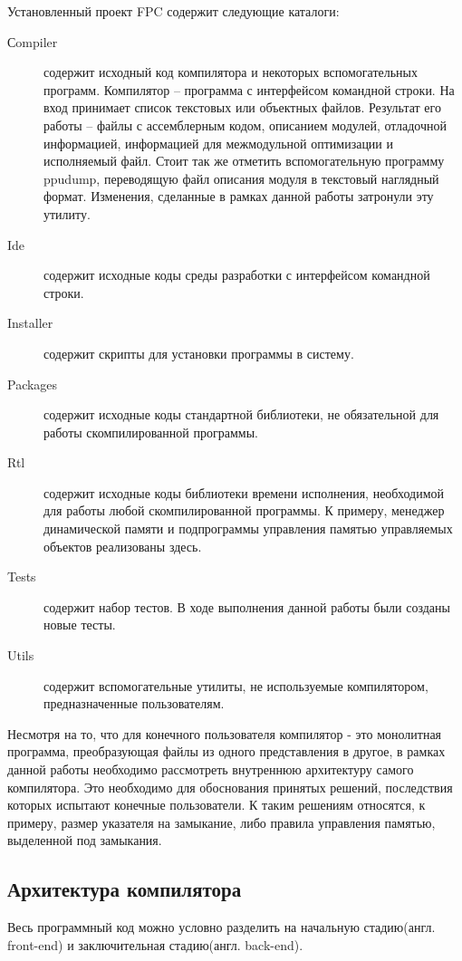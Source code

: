\documentclass{imcs}
\begin{document}
Установленный проект FPC содержит следующие каталоги:
\begin{description}
  \item[Сompiler] содержит исходный код компилятора и некоторых 
  вспомогательных программ. Компилятор -- программа с интерфейсом командной строки. На вход
принимает список текстовых или объектных файлов. Результат его работы --
файлы с ассемблерным кодом, описанием модулей, отладочной информацией,
информацией для межмодульной оптимизации и исполняемый файл. Стоит так же отметить
вспомогательную программу ppudump, переводящую файл описания модуля в текстовый наглядный
формат. Изменения, сделанные в рамках данной работы затронули эту утилиту.
    \item[Ide] содержит исходные коды среды разработки с интерфейсом командной строки.
    \item[Installer] содержит скрипты для установки программы в систему.
    \item[Packages] содержит исходные коды стандартной библиотеки, не обязательной для работы скомпилированной программы.
    \item[Rtl] содержит исходные коды библиотеки времени исполнения, необходимой для работы любой скомпилированной программы. К 
примеру, менеджер динамической памяти и подпрограммы управления памятью
управляемых объектов реализованы здесь.
    \item[Tests] содержит набор тестов. В ходе выполнения данной работы были созданы
новые тесты.
    \item[Utils] содержит вспомогательные утилиты, не используемые компилятором,
предназначенные пользователям.
\end{description}

Несмотря на то, что для конечного пользователя компилятор - это монолитная
программа, преобразующая файлы из одного представления в другое, в рамках
данной работы необходимо рассмотреть внутреннюю архитектуру самого компилятора.
Это необходимо для обоснования принятых решений, последствия которых 
испытают конечные пользователи. К таким решениям относятся, к примеру,
размер указателя на замыкание, либо правила управления памятью,
выделенной под замыкания.

\subsection{Архитектура компилятора}

Весь программный код можно условно разделить на начальную стадию(англ. front-end)
и заключительная стадию(англ. back-end)\cite{dragonbook}.
\end{document}
